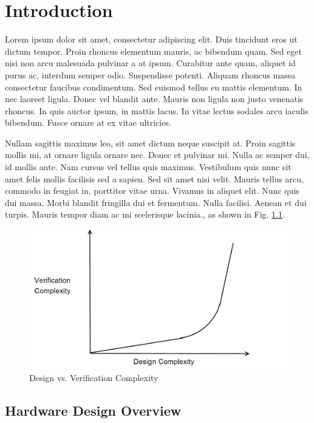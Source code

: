 \chapter{Introduction}
\label{ch:intro1}

Lorem ipsum dolor sit amet, consectetur adipiscing elit. Duis tincidunt eros ut dictum tempor. Proin rhoncus elementum mauris, ac bibendum quam. Sed eget nisi non arcu malesuada pulvinar a at ipsum. Curabitur ante quam, aliquet id purus ac, interdum semper odio. Suspendisse potenti. Aliquam rhoncus massa consectetur faucibus condimentum. Sed euismod tellus eu mattis elementum. In nec laoreet ligula. Donec vel blandit ante. Mauris non ligula non justo venenatis rhoncus. In quis auctor ipsum, in mattis lacus. In vitae lectus sodales arcu iaculis bibendum. Fusce ornare at ex vitae ultricies.

Nullam sagittis maximus leo, sit amet dictum neque suscipit at. Proin sagittis mollis mi, at ornare ligula ornare nec. Donec et pulvinar mi. Nulla ac semper dui, id mollis ante. Nam cursus vel tellus quis maximus. Vestibulum quis nunc sit amet felis mollis facilisis sed a sapien. Sed sit amet nisi velit. Mauris tellus arcu, commodo in feugiat in, porttitor vitae urna. Vivamus in aliquet elit. Nunc quis dui massa. Morbi blandit fringilla dui et fermentum. Nulla facilisi. Aenean et dui turpis. Mauris tempor diam ac mi scelerisque lacinia.\cite{fv_graph:book}, as shown in Fig. \ref{fig:fv_graph}.

\begin{figure}[H]
    \centering
    \includegraphics[scale = 0.5]{fv_graph.PNG}
    \caption{Design vs. Verification Complexity}
    \label{fig:fv_graph}
\end{figure}

\section{Hardware Design Overview}

